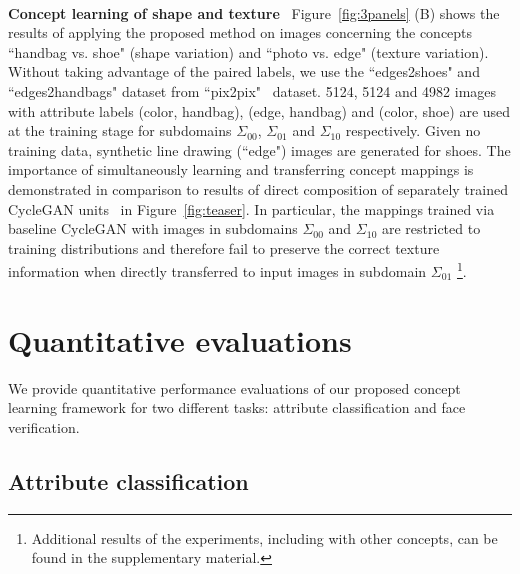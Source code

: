 \documentclass[10pt,twocolumn,letterpaper]{article}
\begin{document}
\\\textbf{Concept learning of shape and texture}
~Figure~\ref{fig:3panels} (B) shows the results of applying the proposed method on images concerning the concepts ``handbag vs. shoe" (shape variation) and ``photo vs. edge" (texture variation). Without taking advantage of the paired labels, we use the ``edges2shoes" and ``edges2handbags" dataset from ``pix2pix"~\cite{pix2pix} dataset. 5124, 5124 and 4982 images with attribute labels (color, handbag), (edge, handbag) and (color, shoe) are used at the training stage for subdomains $\Sigma_{00}$, $\Sigma_{01}$ and $\Sigma_{10}$ respectively. Given no training data, synthetic line drawing (``edge") images are generated for shoes. 
The importance of simultaneously learning and transferring concept mappings is demonstrated in comparison to results of direct composition of separately trained CycleGAN units~\cite{CycleGAN} in Figure~\ref{fig:teaser}. In particular, the mappings trained via baseline CycleGAN with images in subdomains $\Sigma_{00}$ and $\Sigma_{10}$ are restricted to training distributions and therefore fail to preserve the correct texture information when directly transferred to input images in subdomain $\Sigma_{01}$ \footnote{Additional results of the experiments, including with other concepts, can be found in the supplementary material.}.%



\section{Quantitative evaluations}
We provide quantitative performance evaluations of our proposed concept learning framework for two different tasks: attribute classification and face verification.

\subsection{Attribute classification}
\end{document}
